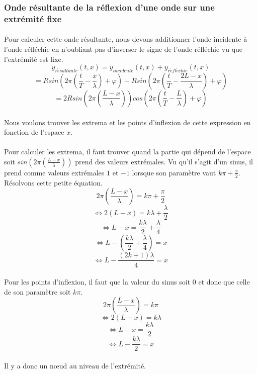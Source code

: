 \documentclass[a4paper]{article}
\begin{document}
\subsubsection{Onde résultante de la réflexion d'une onde sur une extrémité fixe}
\paragraph{}Pour calculer cette onde résultante, nous devons additionner l'onde incidente à l'onde réfléchie en n'oubliant pas d'inverser le signe de l'onde réfléchie vu que l'extrémité est fixe.
\[y_{r\acute{e}sultante}(t,x)=y_{incidente}(t,x)+y_{r\acute{e}fl\acute{e}chie}(t,x)\]
\[=Rsin\left(2\pi \left(\frac{t}{T}-\frac{x}{\lambda}\right)+\varphi\right)-Rsin\left(2\pi \left(\frac{t}{T}-\frac{2L-x}{\lambda}\right)+\varphi\right)\]
\[=2Rsin\left(2\pi \left(\frac{L-x}{\lambda}\right)\right)cos\left(2\pi \left(\frac{t}{T}-\frac{L}{\lambda}\right)+\varphi\right)\]
\paragraph{}Nous voulons trouver les extrema et les points d'inflexion de cette expression en fonction de l'espace $x$.
\paragraph{}Pour calculer les extrema, il faut trouver quand la partie qui dépend de l'espace soit $sin\left(2\pi \left(\frac{L-x}{\lambda}\right)\right)$ prend des valeurs extrémales. Vu qu'il s'agit d'un sinus, il prend comme valeurs extrémales $1$ et $-1$ lorsque son paramètre vaut $k\pi+\frac{\pi}{2}$. Résolvons cette petite équation.
\[2\pi\left(\frac{L-x}{\lambda}\right)=k\pi+\frac{\pi}{2}\]
\[\Leftrightarrow 2\left(L-x\right)=k\lambda+\frac{\lambda}{2}\]
\[\Leftrightarrow L-x=\frac{k\lambda}{2}+\frac{\lambda}{4}\]
\[\Leftrightarrow L-\left(\frac{k\lambda}{2}+\frac{\lambda}{4}\right)=x\]
\[\Leftrightarrow L-\frac{(2k+1)\lambda}{4}=x\]
\paragraph{}Pour les points d'inflexion, il faut que la valeur du sinus soit $0$ et donc que celle de son paramètre soit $k\pi$.
\[2\pi\left(\frac{L-x}{\lambda}\right)=k\pi\]
\[\Leftrightarrow 2\left(L-x\right)=k\lambda\]
\[\Leftrightarrow L-x=\frac{k\lambda}{2}\]
\[\Leftrightarrow L-\frac{k\lambda}{2}=x\]
\paragraph{}Il y a donc un nœud au niveau de l'extrémité.
\end{document}

